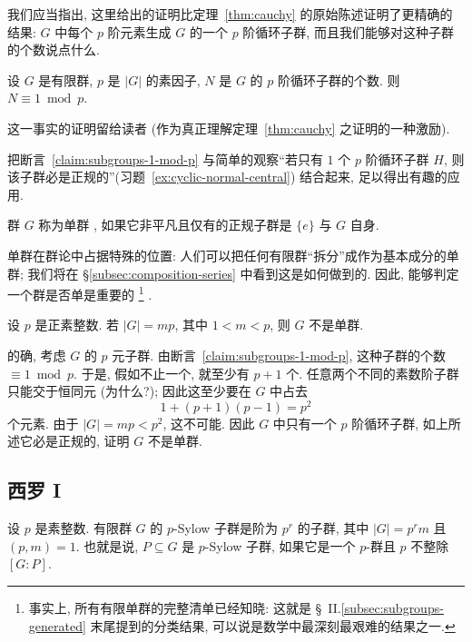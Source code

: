 我们应当指出, 这里给出的证明比定理~\ref{thm:cauchy} 的原始陈述证明了更精确的结果: $G$ 中每个 $p$ 阶元素生成 $G$ 的一个 $p$ 阶循环子群, 而且我们能够对这种子群的个数说点什么.

\begin{claim}
\label{claim:subgroups-1-mod-p}
设 $G$ 是有限群, $p$ 是 $|G|$ 的素因子, $N$ 是 $G$ 的 $p$ 阶循环子群的个数. 则 $N \equiv 1 \bmod p$.
\end{claim}

这一事实的证明留给读者 (作为真正理解定理~\ref{thm:cauchy} 之证明的一种激励).

把断言~\ref{claim:subgroups-1-mod-p} 与简单的观察``若只有 $1$ 个 $p$ 阶循环子群 $H$, 则该子群必是正规的''(习题~\ref{ex:cyclic-normal-central}) 结合起来, 足以得出有趣的应用.

\begin{definition}
\label{def:simple}
群 $G$ 称为单群%
, 如果它非平凡且仅有的正规子群是 $\{e\}$ 与 $G$ 自身.
\end{definition}

单群在群论中占据特殊的位置: 人们可以把任何有限群``拆分''成作为基本成分的单群; 我们将在 \S\ref{subsec:composition-series} 中看到这是如何做到的. 因此, 能够判定一个群是否单是重要的%
\footnote{事实上, 所有有限单群的完整清单已经知晓: 这就是 \S~II.\ref{subsec:subgroups-generated} 末尾提到的分类结果, 可以说是数学中最深刻最艰难的结果之一.}%
.

\begin{example}
\label{ex:mp-not-simple}
设 $p$ 是正素整数. 若 $|G| = mp$, 其中 $1 < m < p$, 则 $G$ 不是单群.

的确, 考虑 $G$ 的 $p$ 元子群. 由断言~\ref{claim:subgroups-1-mod-p}, 这种子群的个数 $\equiv 1 \bmod p$. 于是, 假如不止一个, 就至少有 $p + 1$ 个. 任意两个不同的素数阶子群只能交于恒同元 (为什么?); 因此这至少要在 $G$ 中占去
\[
1 + (p+1)(p-1) = p^2
\]
个元素. 由于 $|G| = mp < p^2$, 这不可能. 因此 $G$ 中只有一个 $p$ 阶循环子群, 如上所述它必是正规的, 证明 $G$ 不是单群.
\end{example}

\subsection{西罗 I}
\label{subsec:sylow-I}

设 $p$ 是素整数. 有限群 $G$ 的 $p$-Sylow 子群是阶为 $p^r$ 的子群, 其中 $|G| = p^r m$ 且 $(p, m) = 1$. 也就是说, $P \subseteq G$ 是 $p$-Sylow 子群, 如果它是一个 $p$-群且 $p$ 不整除 $[G:P]$.

